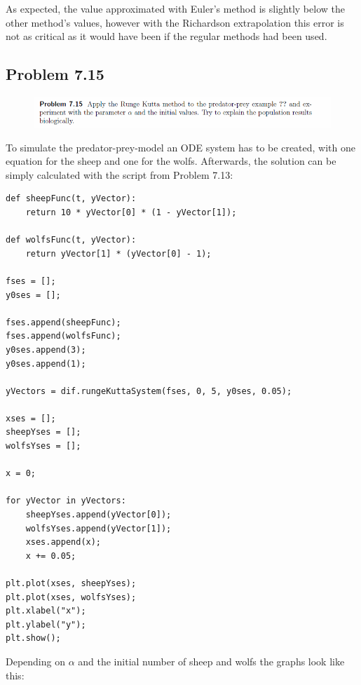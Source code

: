 As expected, the value approximated with Euler's method is slightly below the other method's values, however with the Richardson extrapolation this error is not as critical as it would have been if the regular methods had been used.


\subsection{Problem 7.15}


\begin{figure}[!ht]
\includegraphics[width=1\textwidth]{chapters/images/desc-7-15}
\end{figure}

To simulate the predator-prey-model an ODE system has to be created, with one equation for the sheep and one for the wolfs. Afterwards, the solution can be simply calculated with the script from Problem 7.13:

\begin{lstlisting}[caption=Problem 7.15]
def sheepFunc(t, yVector):
	return 10 * yVector[0] * (1 - yVector[1]);

def wolfsFunc(t, yVector):
	return yVector[1] * (yVector[0] - 1);

fses = [];
y0ses = [];

fses.append(sheepFunc);
fses.append(wolfsFunc);
y0ses.append(3);
y0ses.append(1);

yVectors = dif.rungeKuttaSystem(fses, 0, 5, y0ses, 0.05);

xses = [];
sheepYses = [];
wolfsYses = [];

x = 0;

for yVector in yVectors:
	sheepYses.append(yVector[0]);
	wolfsYses.append(yVector[1]);
	xses.append(x);
	x += 0.05;

plt.plot(xses, sheepYses);
plt.plot(xses, wolfsYses);
plt.xlabel("x");
plt.ylabel("y");
plt.show();
\end{lstlisting}

Depending on $\alpha$ and the initial number of sheep and wolfs the graphs look like this:

